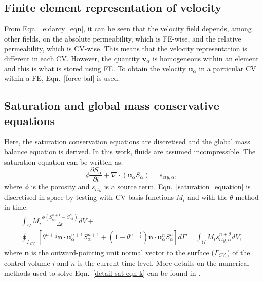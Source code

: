 \documentclass[times]{fldauth}
\begin{document}
\subsection{Finite element representation of velocity} \label{Section:Force_density}
From Eqn.~\ref{e:darcy_eqn}, it can be seen that the velocity field
depends, among other fields, on the absolute permeability, which is
FE-wise, and the relative permeability, which is CV-wise. This means
that the velocity representation is different in each CV. However, the
quantity $\mathbf{v}_\alpha$ is homogeneous within an element and this
is what is stored using FE. To obtain the velocity
$\mathbf{u}_{\alpha}$ in a particular CV within a FE,
Eqn.~\ref{force-bal} is used.


\subsection{Saturation and global mass conservative equations} \label{Section:Saturation_Global}
Here, the saturation conservation equations are discretised and the
global mass balance equation is derived. In this work, fluids are
assumed incompressible. The saturation equation can be written as:
\begin{equation}
  \phi\displaystyle\frac{\partial S_{\alpha} }{\partial t} + \nabla
  \cdot \left( {\mathbf u}_{\alpha} S_{\alpha}\right) =
  s_{cty,\alpha},
  \label{saturation_equation}
\end{equation}
where $\phi$ is the porosity and $s_{cty}$ is a source
term. Eqn.~\ref{saturation_equation} is discretised in space by
testing with CV basis functions $M_{i}$ and with the $\theta$-method
in time:
\begin{eqnarray}
  \int_{\Omega} M_{i} \displaystyle\frac{\phi \left({S_{\alpha
        i}^{n+1}}-{S_{\alpha i}^{n}}\right)}{\Delta t} dV + \nonumber
  \\ \oint_{\Gamma_{CV_{i}}} \left[\theta^{n+\frac{1}{2}} {\mathbf n}
    \cdot {\mathbf u}_{\alpha}^{n+1} S_{\alpha}^{n+1} +
    \left(1-\theta^{n+\frac{1}{2}}\right) {\mathbf n} \cdot {\mathbf
      u}_{\alpha}^{n} S_{\alpha}^{n} \right]d\Gamma = \int_{\Omega}
  M_{i} {s_{cty,\alpha}^{n+\theta}} dV,
  \label{detail-sat-eqn-k}
\end{eqnarray}
where $\mathbf{n}$ is the outward-pointing unit normal vector to the
surface ($\Gamma_{CV_{i}}$) of the control volume $i$ and $n$ is the
current time level. More details on the numerical methods used to
solve Eqn.~\ref{detail-sat-eqn-k} can be found in
\cite{pavlidis_2013b}.
\end{document}
